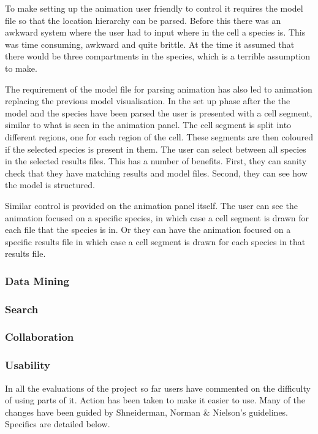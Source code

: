 To make setting up the animation user friendly to control it requires the model file so that the location hierarchy can be parsed.  Before this there was an awkward system where the user had to input where in the cell a species is.  This was time consuming, awkward and quite brittle.  At the time it assumed that there would be three compartments in the species, which is a terrible assumption to make.

The requirement of the model file for parsing animation has also led to animation replacing the previous model visualisation.  In the set up phase after the the model and the species have been parsed the user is presented with a cell segment, similar to what is seen in the animation panel.  The cell segment is split into different regions, one for each region of the cell.  These segments are then coloured if the selected species is present in them.  The user can select between all species in the selected results files.  This has a number of benefits.  First, they can sanity check that they have matching results and model files.  Second, they can see how the model is structured.

Similar control is provided on the animation panel itself.  The user can see the animation focused on a specific species, in which case a cell segment is drawn for each file that the species is in.  Or they can have the animation focused on a specific results file in which case a cell segment is drawn for each species in that results file.

\subsubsection{Data Mining}

\subsubsection{Search}

\subsubsection{Collaboration}

\subsubsection{Usability}

In all the evaluations of the project so far users have commented on the difficulty of using parts of it.  Action has been taken to make it easier to use.  Many of the changes have been guided by Shneiderman, Norman \& Nielson's guidelines.  Specifics are detailed below.

